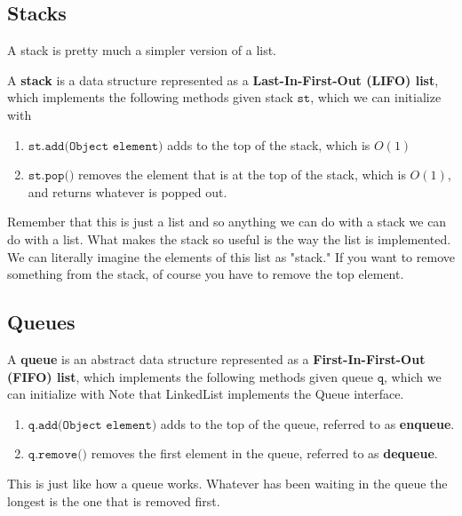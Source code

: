 \subsection{Stacks} 

  A stack is pretty much a simpler version of a list. 

  \begin{definition}[Stack]
    A \textbf{stack} is a data structure represented as a \textbf{Last-In-First-Out (LIFO) list}, which implements the following methods given stack $\texttt{st}$, which we can initialize with 
    \begin{enumerate}
      \item $\texttt{st.add(Object element)}$ adds to the top of the stack, which is $O(1)$ 
      \item $\texttt{st.pop()}$ removes the element that is at the top of the stack, which is $O(1)$, and returns whatever is popped out. 
    \end{enumerate}
    Remember that this is just a list and so anything we can do with a stack we can do with a list. What makes the stack so useful is the way the list is implemented. We can literally imagine the elements of this list as "stack." If you want to remove something from the stack, of course you have to remove the top element. 
  \end{definition}

\subsection{Queues}

  \begin{definition}[Queue]
    A \textbf{queue} is an abstract data structure represented as a \textbf{First-In-First-Out (FIFO) list}, which implements the following methods given queue $\texttt{q}$, which we can initialize with Note that LinkedList implements the Queue interface. 
    \begin{enumerate}
        \item $\texttt{q.add(Object element)}$ adds to the top of the queue, referred to as \textbf{enqueue}. 
        \item $\texttt{q.remove()}$ removes the first element in the queue, referred to as \textbf{dequeue}. 
    \end{enumerate}
    This is just like how a queue works. Whatever has been waiting in the queue the longest is the one that is removed first. 
  \end{definition}

